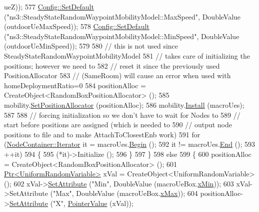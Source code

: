 \begin{DoxyCode}
      ueZ));
577       \hyperlink{group__config_ga2e7882df849d8ba4aaad31c934c40c06}{Config::SetDefault} (\textcolor{stringliteral}{"ns3::SteadyStateRandomWaypointMobilityModel::MaxSpeed"}, 
      DoubleValue (outdoorUeMaxSpeed));
578       \hyperlink{group__config_ga2e7882df849d8ba4aaad31c934c40c06}{Config::SetDefault} (\textcolor{stringliteral}{"ns3::SteadyStateRandomWaypointMobilityModel::MinSpeed"}, 
      DoubleValue (outdoorUeMinSpeed));
579 
580       \textcolor{comment}{// this is not used since SteadyStateRandomWaypointMobilityModel}
581       \textcolor{comment}{// takes care of initializing the positions;  however we need to}
582       \textcolor{comment}{// reset it since the previously used PositionAllocator}
583       \textcolor{comment}{// (SameRoom) will cause an error when used with homeDeploymentRatio=0}
584       positionAlloc = CreateObject<RandomBoxPositionAllocator> ();
585       mobility.\hyperlink{classns3_1_1MobilityHelper_ac59d5295076be3cc11021566713a28c5}{SetPositionAllocator} (positionAlloc);
586       mobility.\hyperlink{classns3_1_1MobilityHelper_a07737960ee95c0777109cf2994dd97ae}{Install} (macroUes);
587       
588       \textcolor{comment}{// forcing initialization so we don't have to wait for Nodes to}
589       \textcolor{comment}{// start before positions are assigned (which is needed to}
590       \textcolor{comment}{// output node positions to file and to make AttachToClosestEnb work)}
591       \textcolor{keywordflow}{for} (\hyperlink{classns3_1_1NodeContainer_aa1a9f2d2b09bfef7d066d3974bca2cc4}{NodeContainer::Iterator} it = macroUes.\hyperlink{classns3_1_1NodeContainer_adf0f639aff139db107526288777eb533}{Begin} ();
592            it != macroUes.\hyperlink{classns3_1_1NodeContainer_a8ea0bcac137597d192c5e6b95ca60464}{End} ();
593            ++it)
594         \{
595           (*it)->Initialize ();
596         \}
597     \}
598     \textcolor{keywordflow}{else}
599     \{
600       positionAlloc = CreateObject<RandomBoxPositionAllocator> ();
601       \hyperlink{classns3_1_1Ptr}{Ptr<UniformRandomVariable>} xVal = CreateObject<UniformRandomVariable> ();
602       xVal->\hyperlink{classns3_1_1ObjectBase_ac60245d3ea4123bbc9b1d391f1f6592f}{SetAttribute} (\textcolor{stringliteral}{"Min"}, DoubleValue (macroUeBox.\hyperlink{classns3_1_1Box_a1fd6a43d53258323331d34da600ff1c5}{xMin}));
603       xVal->SetAttribute (\textcolor{stringliteral}{"Max"}, DoubleValue (macroUeBox.\hyperlink{classns3_1_1Box_a50021049c756e770329145b25d9533a2}{xMax}));
604       positionAlloc->\hyperlink{classns3_1_1ObjectBase_ac60245d3ea4123bbc9b1d391f1f6592f}{SetAttribute} (\textcolor{stringliteral}{"X"}, \hyperlink{classns3_1_1PointerValue}{PointerValue} (xVal));

\end{DoxyCode}
